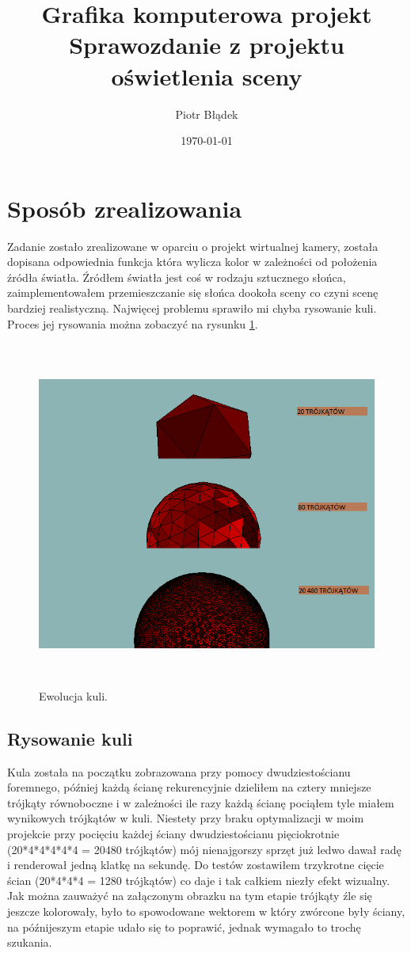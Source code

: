 \documentclass[a4paper,11pt,notitlepage]{article}
\author{Piotr Błądek}
\title{Grafika komputerowa projekt \\ Sprawozdanie z projektu oświetlenia sceny}
\date{\today}
\begin{document}
\maketitle

\section{Sposób zrealizowania}

Zadanie zostało zrealizowane w oparciu o projekt wirtualnej kamery, została dopisana odpowiednia funkcja która wylicza kolor w zależności od położenia źródła światła. Źródłem światła jest coś w rodzaju sztucznego słońca, zaimplementowałem przemieszczanie się słońca dookoła sceny co czyni scenę bardziej realistyczną. Najwięcej problemu sprawiło mi chyba rysowanie kuli. Proces jej rysowania można zobaczyć na rysunku \ref{fig:kula}.

\begin{figure}[!tb]
    \centering
    \includegraphics[width=\textwidth,height=4.5in]{kula.png}
    \caption{Ewolucja kuli.}
    \label{fig:kula}
\end{figure}

\subsection{Rysowanie kuli}

Kula została na początku zobrazowana przy pomocy dwudziestościanu foremnego, później każdą ścianę rekurencyjnie dzieliłem na cztery mniejsze trójkąty równoboczne i w zależności ile razy każdą ścianę pociąłem tyle miałem wynikowych trójkątów w kuli. Niestety przy braku optymalizacji w moim projekcie przy pocięciu każdej ściany  dwudziestościanu pięciokrotnie (20*4*4*4*4*4 = 20480 trójkątów) mój nienajgorszy sprzęt już ledwo dawał radę i renderował jedną klatkę na sekundę. Do testów zostawiłem trzykrotne cięcie ścian (20*4*4*4 = 1280 trójkątów) co daje i tak całkiem niezły efekt wizualny. Jak można zauważyć na załączonym obrazku na tym etapie trójkąty źle się jeszcze kolorowały, było to spowodowane wektorem w który zwórcone były ściany, na późnijeszym etapie udało się to poprawić, jednak wymagało to trochę szukania. 
\end{document}

